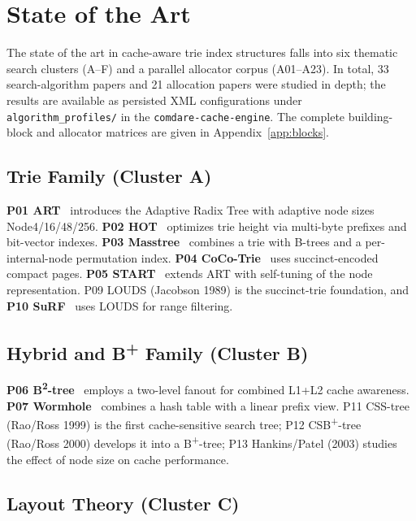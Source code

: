 \chapter{State of the Art}\label{ch:sota}

The state of the art in cache-aware trie index structures falls into six thematic
search clusters (A--F) and a parallel allocator corpus (A01--A23). In total, 33
search-algorithm papers and 21 allocation papers were studied in depth; the results are
available as persisted XML configurations under \texttt{algorithm\_profiles/} in the
\texttt{comdare-cache-engine}. The complete building-block and allocator matrices are
given in Appendix~\ref{app:blocks}.

\section{Trie Family (Cluster A)}\label{sec:cluster-a}

\textbf{P01 ART}~\cite{leis2013art} introduces the Adaptive Radix Tree with adaptive node
sizes Node4/16/48/256. \textbf{P02 HOT}~\cite{binna2018hot} optimizes trie height via
multi-byte prefixes and bit-vector indexes. \textbf{P03 Masstree}~\cite{mao2012masstree}
combines a trie with B-trees and a per-internal-node permutation index. \textbf{P04
CoCo-Trie}~\cite{boffa2024coco} uses succinct-encoded compact pages. \textbf{P05
START}~\cite{fent2020start} extends ART with self-tuning of the node representation. P09
LOUDS (Jacobson 1989) is the succinct-trie foundation, and \textbf{P10
SuRF}~\cite{zhang2018surf} uses LOUDS for range filtering.

\section{Hybrid and B\texorpdfstring{\textsuperscript{+}}{+} Family (Cluster B)}\label{sec:cluster-b}

\textbf{P06 B\textsuperscript{2}-tree}~\cite{schmeisser2022b2tree} employs a two-level
fanout for combined L1+L2 cache awareness. \textbf{P07 Wormhole}~\cite{wu2019wormhole}
combines a hash table with a linear prefix view. P11 CSS-tree (Rao/Ross 1999) is the first
cache-sensitive search tree; P12 CSB\textsuperscript{+}-tree (Rao/Ross 2000) develops it
into a B\textsuperscript{+}-tree; P13 Hankins/Patel (2003) studies the effect of node size
on cache performance.

\section{Layout Theory (Cluster C)}\label{sec:cluster-c}

